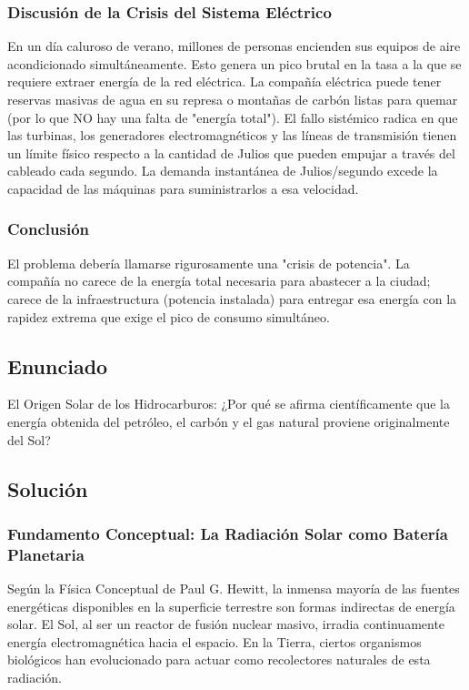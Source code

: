 \documentclass[12pt,a4paper]{article}
\begin{document}
\subsubsection*{Discusión de la Crisis del Sistema Eléctrico}
En un día caluroso de verano, millones de personas encienden sus equipos de aire acondicionado simultáneamente. Esto genera un pico brutal en la tasa a la que se requiere extraer energía de la red eléctrica. La compañía eléctrica puede tener reservas masivas de agua en su represa o montañas de carbón listas para quemar (por lo que NO hay una falta de "energía total"). 
El fallo sistémico radica en que las turbinas, los generadores electromagnéticos y las líneas de transmisión tienen un límite físico respecto a la cantidad de Julios que pueden empujar a través del cableado cada segundo. La demanda instantánea de Julios/segundo excede la capacidad de las máquinas para suministrarlos a esa velocidad.

\subsubsection*{Conclusión}
El problema debería llamarse rigurosamente una "crisis de potencia". La compañía no carece de la energía total necesaria para abastecer a la ciudad; carece de la infraestructura (potencia instalada) para entregar esa energía con la rapidez extrema que exige el pico de consumo simultáneo.

\newpage

\subsection*{Enunciado}
El Origen Solar de los Hidrocarburos: ¿Por qué se afirma científicamente que la energía obtenida del petróleo, el carbón y el gas natural proviene originalmente del Sol?

\subsection*{Solución}

\subsubsection*{Fundamento Conceptual: La Radiación Solar como Batería Planetaria}
Según la Física Conceptual de Paul G. Hewitt, la inmensa mayoría de las fuentes energéticas disponibles en la superficie terrestre son formas indirectas de energía solar. El Sol, al ser un reactor de fusión nuclear masivo, irradia continuamente energía electromagnética hacia el espacio. En la Tierra, ciertos organismos biológicos han evolucionado para actuar como recolectores naturales de esta radiación.
\end{document}
